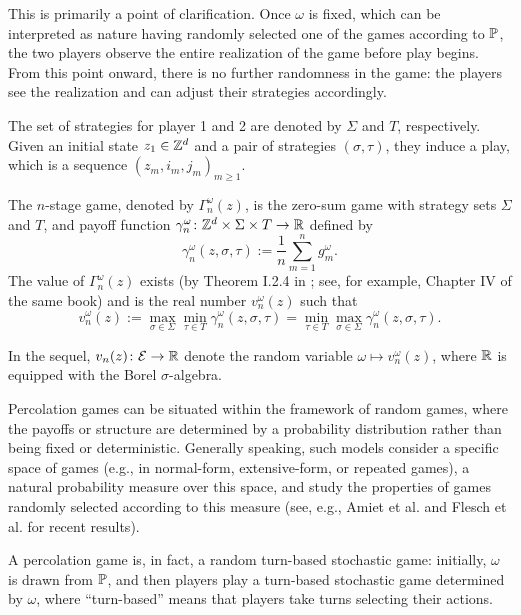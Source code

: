 	\begin{remark}
		This is primarily a point of clarification. Once $\omega$ is fixed, which can be interpreted as nature having randomly selected one of the games according to $\mathbb{P}$, the two players observe the entire realization of the game before play begins. From this point onward, there is no further randomness in the game: the players see the realization and can adjust their strategies accordingly.
	\end{remark}

	The set of strategies for player 1 and 2 are denoted by $\Sigma$ and $T$, respectively. Given an  initial state $z_1 \in \mathbb{Z}^d$ and a pair of strategies $(\sigma, \tau)$, they induce a play, which is a sequence $(z_m, i_m, j_m)_{m\geq1}$.

	The $n$-stage game, denoted by $\Gamma_n^{\omega}(z)$, is the zero-sum game with strategy sets $\Sigma$ and $T$, and payoff function $\gamma_n^{\omega} \colon \mathbb{Z}^d \times \Sigma \times T \to \mathbb{R}$ defined by
	\[
		\gamma_n^{\omega}(z, \sigma, \tau) := \frac{1}{n}\sum_{m=1}^ng_m^{\omega}.
	\]
	The value of $\Gamma_n^{\omega}(z)$ exists (by Theorem I.2.4 in \cite{Mertens2015}; see, for example, Chapter IV of the same book) and is the real number $v_n^{\omega}(z)$ such that
	\[
		v_n^{\omega}(z) := \max_{\sigma \in \Sigma}\min_{\tau \in T} \gamma_n^{\omega}(z, \sigma, \tau) = \min_{\tau \in T}\max_{\sigma \in \Sigma} \gamma_n^{\omega}(z, \sigma, \tau).
	\]

	In the sequel, $v_n(z) \colon \mathcal{E} \to \mathbb{R}$ denote the random variable $\omega \mapsto v_n^{\omega}(z)$, where $\mathbb{R}$ is equipped with the Borel $\sigma$-algebra.
	
	Percolation games can be situated within the framework of random games, where the payoffs or structure are determined by a probability distribution rather than being fixed or deterministic. Generally speaking, such models consider a specific space of games (e.g., in normal-form, extensive-form, or repeated games), a natural probability measure over this space, and study the properties of games randomly selected according to this measure (see, e.g., Amiet et al. \cite{Amiet2021} and Flesch et al. \cite{Flesch2023} for recent results).

	A percolation game is, in fact, a random turn-based stochastic game: initially, $\omega$ is drawn from $\mathbb{P}$, and then players play a turn-based stochastic game determined by $\omega$, where ``turn-based'' means that players take turns selecting their actions.

